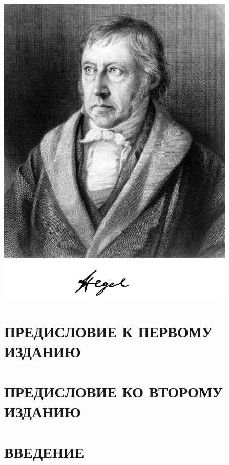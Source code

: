 \documentclass[a5paper, 11pt, twoside, onecolumn, openany]{memoir}
\begin{document}
\thispagestyle{empty}
\begin{center}
\includegraphics[width=11.4cm]{hegel-img001.png}
\end{center}

\restoregeometry

\chapter[Предисловие к первому изданию]{\large ПРЕДИСЛОВИЕ К ПЕРВОМУ ИЗДАНИЮ}


\clearpage

\chapter[Предисловие ко второму изданию]{\large ПРЕДИСЛОВИЕ КО ВТОРОМУ ИЗДАНИЮ}


\clearpage

\chapter[Введение]{ВВЕДЕНИЕ}

\end{document}
